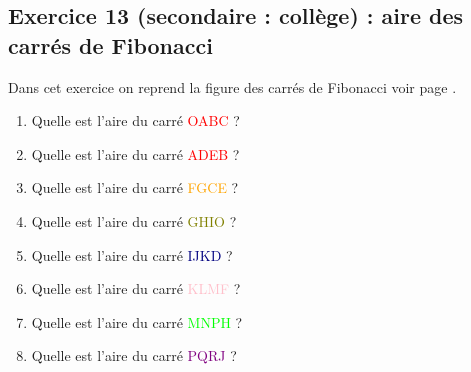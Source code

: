 \subsection{Exercice 13 (secondaire : collège) : aire des carrés de Fibonacci}

\label{geom:niveau13}

Dans cet exercice on reprend la figure des carrés de Fibonacci voir page \pageref{sol:niveau12}.

\begin{enumerate}[label=G\arabic*)]
	\item Quelle est l'aire du carré \textcolor{red}{OABC} ?
	\item Quelle est l'aire du carré \textcolor{red}{ADEB} ?
	\item Quelle est l'aire du carré \textcolor{orange}{FGCE} ?
	\item Quelle est l'aire du carré \textcolor{olive}{GHIO} ?
	\item Quelle est l'aire du carré \textcolor{navy}{IJKD} ?
	\item Quelle est l'aire du carré \textcolor{pink}{KLMF} ?
	\item Quelle est l'aire du carré \textcolor{lime}{MNPH} ?
	\item Quelle est l'aire du carré \textcolor{purple}{PQRJ} ?
\end{enumerate}